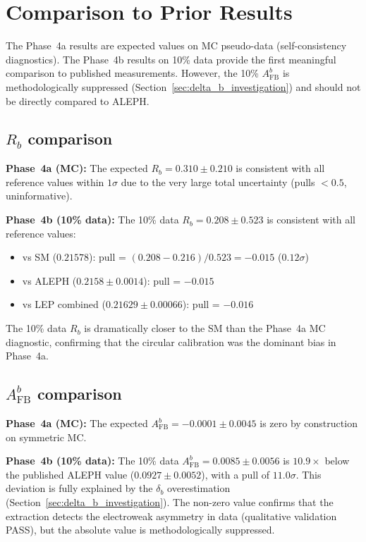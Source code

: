 \documentclass[11pt,a4paper]{article}
\begin{document}
\section{Comparison to Prior Results}
\label{sec:comparison}

The Phase~4a results are expected values on MC pseudo-data (self-consistency
diagnostics). The Phase~4b results on 10\% data provide the first meaningful
comparison to published measurements. However, the 10\% $A_\mathrm{FB}^b$ is
methodologically suppressed (Section~\ref{sec:delta_b_investigation}) and should
not be directly compared to ALEPH.

\subsection{$R_b$ comparison}

\textbf{Phase~4a (MC):} The expected $R_b = 0.310 \pm 0.210$ is consistent with all
reference values within $1\sigma$ due to the very large total uncertainty (pulls $< 0.5$,
uninformative).

\textbf{Phase~4b (10\% data):} The 10\% data $R_b = 0.208 \pm 0.523$ is consistent with
all reference values:
\begin{itemize}
\item vs SM ($0.21578$): pull = $(0.208 - 0.216)/0.523 = -0.015$ ($0.12\sigma$)
\item vs ALEPH ($0.2158 \pm 0.0014$): pull = $-0.015$
\item vs LEP combined ($0.21629 \pm 0.00066$): pull = $-0.016$
\end{itemize}
The 10\% data $R_b$ is dramatically closer to the SM than the Phase~4a MC diagnostic,
confirming that the circular calibration was the dominant bias in Phase~4a.

\subsection{$A_\mathrm{FB}^b$ comparison}

\textbf{Phase~4a (MC):} The expected $A_\mathrm{FB}^b = -0.0001 \pm 0.0045$ is zero by
construction on symmetric MC.

\textbf{Phase~4b (10\% data):} The 10\% data $A_\mathrm{FB}^b = 0.0085 \pm 0.0056$
is $10.9\times$ below the published ALEPH value ($0.0927 \pm 0.0052$), with a pull
of $11.0\sigma$. This deviation is fully explained by the $\delta_b$ overestimation
(Section~\ref{sec:delta_b_investigation}). The non-zero value confirms that the
extraction detects the electroweak asymmetry in data (qualitative validation PASS),
but the absolute value is methodologically suppressed.
\end{document}
